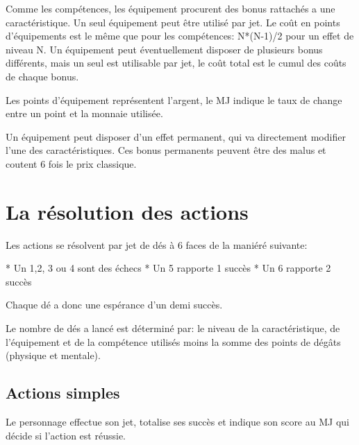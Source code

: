 Comme les compétences, les équipement procurent des bonus rattachés a une caractéristique. Un seul équipement peut être utilisé par jet. Le coût en points d'équipements est le même que pour les compétences: N*(N-1)/2 pour un effet de niveau N. Un équipement peut éventuellement disposer de plusieurs bonus différents, mais un seul est utilisable par jet, le coût total est le cumul des coûts de chaque bonus. 

Les points d'équipement représentent l'argent, le MJ indique le taux de change entre un point et la monnaie utilisée.


Un équipement peut disposer d'un effet permanent, qui va directement modifier l'une des caractéristiques. Ces bonus permanents peuvent être des malus et coutent 6 fois le prix classique.


\section{La résolution des actions}
	
Les actions se résolvent par jet de dés à 6 faces de la maniéré suivante: 

* Un 1,2, 3 ou 4 sont des échecs
* Un 5 rapporte 1 succès
* Un 6 rapporte 2 succès
	
Chaque dé a donc une espérance d'un demi succès.
	
Le nombre de dés a lancé est déterminé par: le niveau de la caractéristique, de l’équipement et de la compétence utilisés moins la somme des points de dégâts (physique et mentale).
	
\subsection{Actions simples}
Le personnage effectue son jet, totalise ses succès et indique son score au MJ qui décide si l'action est réussie.
	

